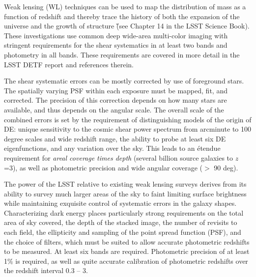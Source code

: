 Weak lensing (WL) techniques can be used to map the distribution of mass as a function
of redshift and thereby trace the history of both the expansion of the universe and the
growth of structure \G{(see Chapter 14 in the LSST Science Book)}. These investigations use
common deep wide-area multi-color imaging with stringent
requirements for the shear systematics in at least two bands and photometry in all bands.
These requirements are covered in more detail in the LSST DETF report and references therein.

The shear systematic errors can be mostly corrected by use of foreground stars.
The spatially varying PSF within each exposure must be mapped, fit, and corrected. The precision of this
correction depends on how many stars are available, and thus depends on the angular scale.
The overall scale of the combined errors is set by the requirement of distinguishing models
of the origin of DE: unique sensitivity to the cosmic shear power spectrum from arcminute
to 100 degree scales and wide redshift range, the ability to probe at least six DE
eigenfunctions, and any variation over the sky. This leads to an \'{e}tendue requirement
for {\it areal coverage times depth} (several billion source galaxies to $z$=3), as well
as photometric precision and wide angular coverage ($>$ 90 deg).

The power of the LSST relative to existing weak lensing surveys derives from its
ability to survey much larger areas of the sky to faint limiting
surface brightness while maintaining exquisite control of systematic errors in the
galaxy shapes. Characterizing dark energy places particularly strong
requirements on the total area of sky covered, the depth of the stacked image, the
number of revisits to each field, the ellipticity and sampling of the point spread
function (PSF), and the choice of filters, which must be suited to allow accurate
photometric redshifts to be measured. At least six bands are required. Photometric precision of at
least 1\% is required, as well as quite accurate calibration of photometric redshifts over the
redshift interval 0.3 -- 3.

